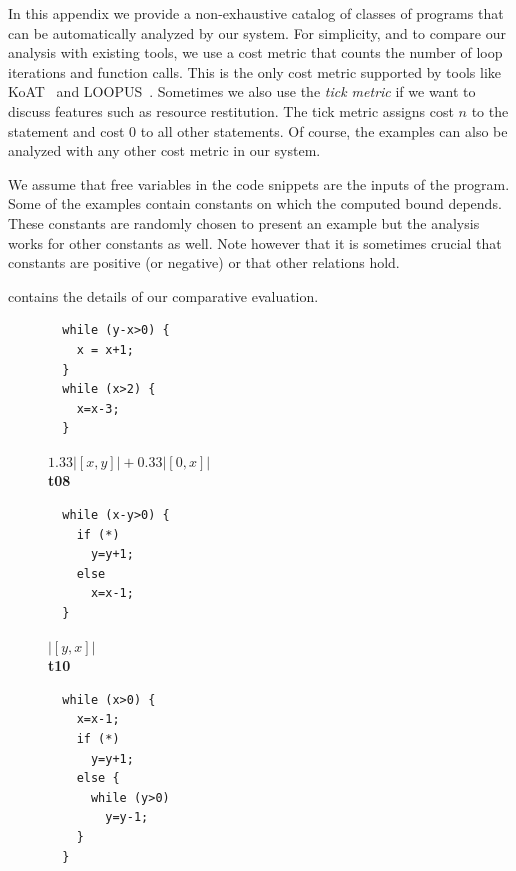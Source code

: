 \documentclass{sigplanconf}
\newcommand{\pref}[1]{\prettyref{#1}}
\begin{document}
{In this appendix we provide a non-exhaustive catalog of classes of
programs that can be automatically analyzed by our system.  For
simplicity, and to compare our analysis with existing tools, we use a
cost metric that counts the number of loop iterations and function
calls.  This is the only cost metric supported by tools like
KoAT~\cite{BrockschmidtEFFG14} and LOOPUS~\cite{SinnZV14}.  Sometimes
we also use the \emph{tick metric} if we want to discuss features such as
resource restitution.  The tick metric assigns cost $n$ to the
statement  and cost $0$ to all other statements. Of
course, the examples can also be analyzed with any other cost metric
in our system.

We assume that free variables in the code snippets are the inputs of
the program. Some of the examples contain constants on which the
computed bound depends.  These constants are randomly chosen to
present an example but the analysis works for other constants as well.
Note however that it is sometimes crucial that constants are positive
(or negative) or that other relations hold.

\pref{tab:eval} contains the details of our comparative evaluation.


\begin{figure}
\setlength{\progwidth}{.24\linewidth}
  \centering

  \begin{minipage}[b]{\progwidth}
    \begin{center}
   \begin{lstlisting}
  while (y-x>0) {
    x = x+1;
  }
  while (x>2) {
    x=x-3;
  }
   \end{lstlisting}

$1.33|[x,y]| + 0.33|[0,x]|$
\\[.7\baselineskip]
      {\bf t08}
    \end{center}
  \end{minipage}
%
%
%
  \begin{minipage}[b]{\progwidth}
    \begin{center}
   \begin{lstlisting}
  while (x-y>0) {
    if (*)
      y=y+1;
    else
      x=x-1;
  }
   \end{lstlisting}

$|[y,x]|$
\\[.7\baselineskip]
      {\bf t10}
    \end{center}
  \end{minipage}
%
%
%
  \begin{minipage}[b]{\progwidth}
    \begin{center}
   \begin{lstlisting}
  while (x>0) {
    x=x-1;
    if (*)
      y=y+1;
    else {
      while (y>0)
        y=y-1;
    }
  }
   \end{lstlisting}


\end{center}
\end{minipage}
\end{figure}}
\end{document}
